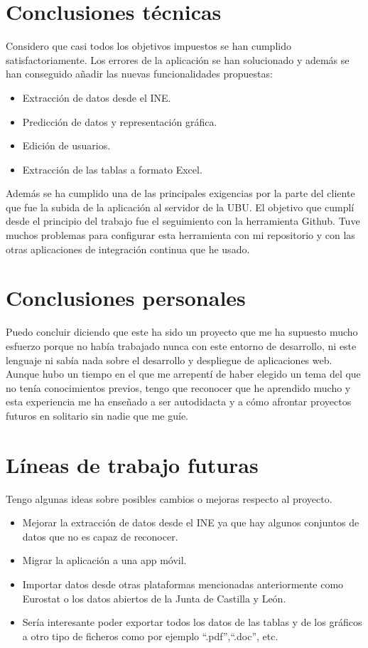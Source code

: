 \section{Conclusiones técnicas}
Considero que casi todos los objetivos impuestos se han cumplido satisfactoriamente. Los errores de la aplicación se han solucionado y además se han conseguido añadir las nuevas funcionalidades propuestas:
\begin{itemize}
    \item Extracción de datos desde el INE.
    \item Predicción de datos y representación gráfica.
    \item Edición de usuarios.
    \item Extracción de las tablas a formato Excel.
\end{itemize}
Además se ha cumplido una de las principales exigencias por la parte del cliente que fue la subida de la aplicación al servidor de la UBU.
El objetivo que cumplí desde el principio del trabajo fue el seguimiento con la herramienta Github. Tuve muchos problemas para configurar esta herramienta con mi repositorio y con las otras aplicaciones de integración continua que he usado.
\section{Conclusiones personales}
Puedo concluir diciendo que este ha sido un proyecto que me ha supuesto mucho esfuerzo porque no había trabajado nunca con este entorno de desarrollo, ni este lenguaje ni sabía nada sobre el desarrollo y despliegue de aplicaciones web.\\
Aunque hubo un tiempo en el que me arrepentí de haber elegido un tema del que no tenía conocimientos previos, tengo que reconocer que he aprendido mucho y esta experiencia me ha enseñado a ser autodidacta y a cómo afrontar proyectos futuros en solitario sin nadie que me guíe.
\section{Líneas de trabajo futuras}
Tengo algunas ideas sobre posibles cambios o mejoras respecto al proyecto.
\begin{itemize}
    \item Mejorar la extracción de datos desde el INE ya que hay algunos conjuntos de datos que no es capaz de reconocer.
    \item Migrar la aplicación a una app móvil.
    \item Importar datos desde otras plataformas mencionadas anteriormente como Eurostat o los datos abiertos de la Junta de Castilla y León.
    \item Sería interesante poder exportar todos los datos de las tablas y de los gráficos a otro tipo de ficheros como por ejemplo “.pdf”,“.doc”, etc.
\end{itemize}